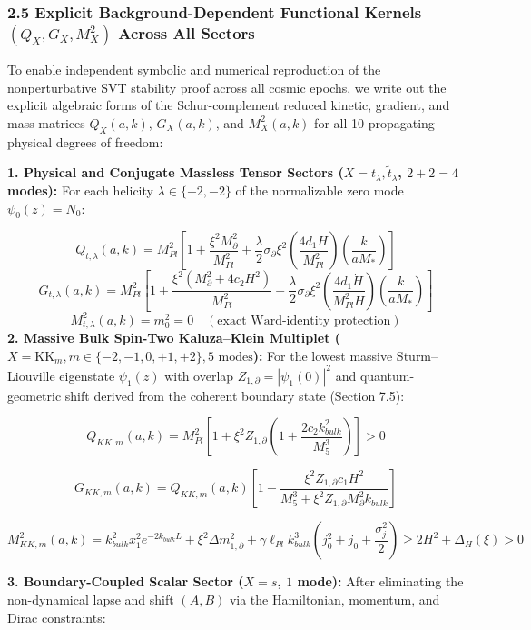 \documentclass[aps,prd,onecolumn,superscriptaddress,nofootinbib,longbibliography,10pt]{revtex4-2}
\begin{document}
  
\subsubsection*{2.5 Explicit Background-Dependent Functional Kernels \((Q_X, G_X, M_X^2)\) Across All Sectors}

  To enable independent symbolic and numerical reproduction of the nonperturbative SVT stability proof across all cosmic epochs, we write out the explicit algebraic forms of the Schur-complement reduced kinetic, gradient, and mass matrices \(Q_X(a,k)\), \(G_X(a,k)\), and \(M_X^2(a,k)\) for all 10 propagating physical degrees of freedom:


  \textbf{1. Physical and Conjugate Massless Tensor Sectors (\(X = t_\lambda, \tilde{t}_\lambda\), \(2 + 2 = 4\) modes):} For each helicity \(\lambda \in \{+2, -2\}\) of the normalizable zero mode \(\psi_0(z) = N_0\):


  \[ Q_{t,\lambda}(a,k) = M_{Pl}^2 \left[ 1 + \frac{\xi^2 M_\partial^2}{M_{Pl}^2} + \frac{\lambda}{2}\sigma_\partial \xi^2 \left(\frac{4d_1 H}{M_{Pl}^2}\right)\left(\frac{k}{aM_*}\right) \right] \]
  \[ G_{t,\lambda}(a,k) = M_{Pl}^2 \left[ 1 + \frac{\xi^2(M_\partial^2 + 4c_2 H^2)}{M_{Pl}^2} + \frac{\lambda}{2}\sigma_\partial \xi^2 \left(\frac{4d_1\dot{H}}{M_{Pl}^2 H}\right)\left(\frac{k}{aM_*}\right) \right] \]
  \[ M_{t,\lambda}^2(a,k) = m_0^2 = 0 \quad (\text{exact Ward-identity protection}) \]
  \textbf{2. Massive Bulk Spin-Two Kaluza–Klein Multiplet (\(X = \mathrm{KK}_m, m \in \{-2, -1, 0, +1, +2\}, 5\text{ modes}\)):} For the lowest massive Sturm–Liouville eigenstate \(\psi_1(z)\) with overlap \(Z_{1,\partial} = |\psi_1(0)|^2\) and quantum-geometric shift derived from the coherent boundary state (Section 7.5):

\[ Q_{KK,m}(a,k) = M_{Pl}^2 \left[1+\xi^2 Z_{1,\partial}\left(1+\frac{2c_2 k_{bulk}^2}{M_5^3}\right)\right] > 0 \]


\[ G_{KK,m}(a,k) = Q_{KK,m}(a,k)\left[ 1 - \frac{\xi^2 Z_{1,\partial} c_1 H^2}{M_5^3 + \xi^2 Z_{1,\partial} M_{\partial}^2 k_{bulk}} \right] \]


\[ M_{KK,m}^2(a,k) = k_{bulk}^2 x_1^2 e^{-2k_{bulk}L} + \xi^2\Delta m_{1,\partial}^2 + \gamma\ell_{Pl}k_{bulk}^3\left( j_0^2 + j_0 + \frac{\sigma_j^2}{2} \right) \ge 2H^2 + \Delta_H(\xi) > 0 \]

\textbf{3. Boundary-Coupled Scalar Sector (\(X = s\), \(1\) mode):} After eliminating the non-dynamical lapse and shift \((A, B)\) via the Hamiltonian, momentum, and Dirac constraints:
\end{document}
